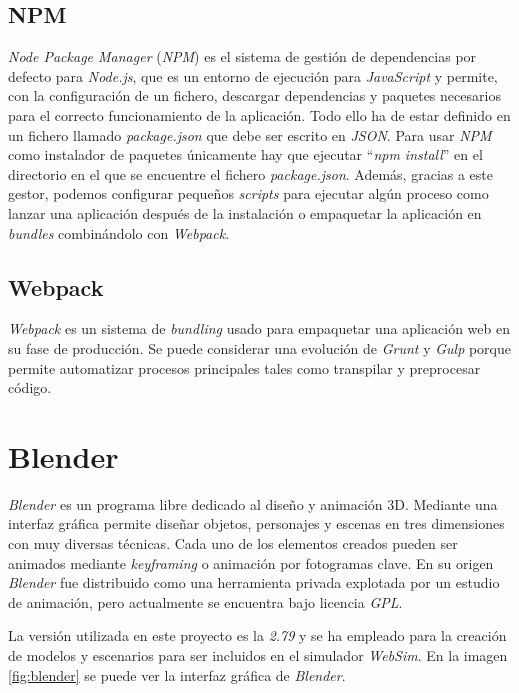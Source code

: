 \subsection{NPM}
\textit{Node Package Manager} (\textit{NPM})\cite{bib:npm} es el sistema de gestión de dependencias por defecto para \textit{Node.js}, que es un entorno de ejecución para \textit{JavaScript} y permite, con la configuración de un fichero, descargar dependencias y paquetes necesarios para el correcto funcionamiento de la aplicación. Todo ello ha de estar definido en un fichero llamado \textit{package.json} que debe ser escrito en \textit{JSON}. Para usar \textit{NPM} como instalador de paquetes únicamente hay que ejecutar ``\textit{npm install}'' en el directorio en el que se encuentre el fichero \textit{package.json}. Además, gracias a este gestor, podemos configurar pequeños \textit{scripts} para ejecutar algún proceso como lanzar una aplicación después de la instalación o empaquetar la aplicación en \textit{bundles} combinándolo con \textit{Webpack}.

\subsection{Webpack}
\textit{Webpack}\cite{bib:webpack} es un sistema de \textit{bundling} usado para empaquetar una aplicación web en su fase de producción. Se puede considerar una evolución de \textit{Grunt}\cite{bib:grunt} y \textit{Gulp} porque permite automatizar procesos principales tales como transpilar y preprocesar código. 


\section{Blender}
\label{sec:blender}
\textit{Blender} es un programa libre dedicado al diseño y animación 3D. Mediante una interfaz gráfica permite diseñar objetos, personajes y escenas en tres dimensiones con muy diversas técnicas. Cada uno de los elementos creados pueden ser animados mediante \textit{keyframing} o animación por fotogramas clave. En su origen \textit{Blender} fue distribuido como una herramienta privada explotada por un estudio de animación, pero actualmente se encuentra bajo licencia \textit{GPL}\cite{bib:gpl}. 

La versión utilizada en este proyecto es la \textit{2.79} y se ha empleado para la creación de modelos y escenarios para ser incluidos en el simulador \textit{WebSim}. En la imagen \ref{fig:blender} se puede ver la interfaz gráfica de \textit{Blender}. \\

